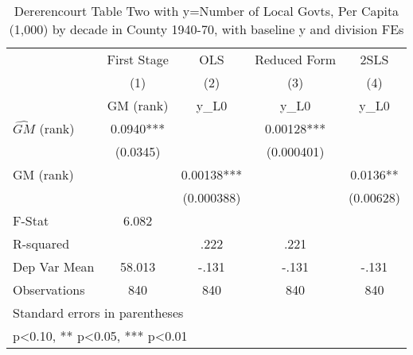 \begin{table}[htbp]\centering
\def\sym#1{\ifmmode^{#1}\else\(^{#1}\)\fi}
\caption{Dererencourt Table Two with y=Number of Local Govts, Per Capita (1,000) by decade in County 1940-70, with baseline y and division FEs}
\begin{tabular}{l*{4}{c}}
\toprule
                    & First Stage   &         OLS   &Reduced Form   &        2SLS   \\
                    &\multicolumn{1}{c}{(1)}&\multicolumn{1}{c}{(2)}&\multicolumn{1}{c}{(3)}&\multicolumn{1}{c}{(4)}\\
                    &\multicolumn{1}{c}{GM  (rank)}&\multicolumn{1}{c}{y\_L0}&\multicolumn{1}{c}{y\_L0}&\multicolumn{1}{c}{y\_L0}\\
\midrule
$\hat{GM}$ (rank)   &      0.0940***&               &     0.00128***&               \\
                    &    (0.0345)   &               &  (0.000401)   &               \\
\addlinespace
GM  (rank)          &               &     0.00138***&               &      0.0136** \\
                    &               &  (0.000388)   &               &   (0.00628)   \\
\midrule
F-Stat              &       6.082   &               &               &               \\
R-squared           &               &        .222   &        .221   &               \\
Dep Var Mean        &      58.013   &       -.131   &       -.131   &       -.131   \\
Observations        &         840   &         840   &         840   &         840   \\
\bottomrule
\multicolumn{5}{l}{\footnotesize Standard errors in parentheses}\\
\multicolumn{5}{l}{\footnotesize * p<0.10, ** p<0.05, *** p<0.01}\\
\end{tabular}
\end{table}
